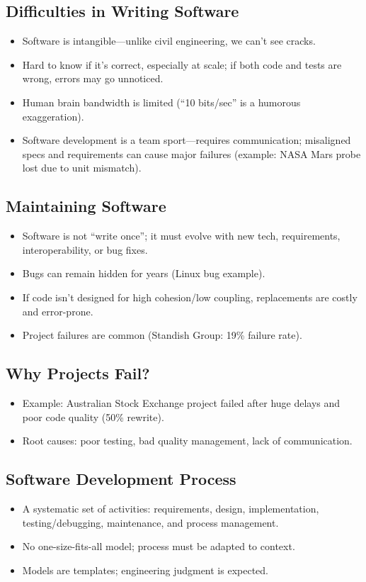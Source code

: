 \documentclass[11pt,a4paper]{article}
\begin{document}
\subsection*{Difficulties in Writing Software}
\begin{itemize}
    \item Software is intangible---unlike civil engineering, we can’t see cracks.
    \item Hard to know if it’s correct, especially at scale; if both code and tests are wrong, errors may go unnoticed.
    \item Human brain bandwidth is limited (``10 bits/sec'' is a humorous exaggeration).
    \item Software development is a team sport---requires communication; misaligned specs and requirements can cause major failures (example: NASA Mars probe lost due to unit mismatch).
\end{itemize}

\subsection*{Maintaining Software}
\begin{itemize}
    \item Software is not ``write once''; it must evolve with new tech, requirements, interoperability, or bug fixes.
    \item Bugs can remain hidden for years (Linux bug example).
    \item If code isn’t designed for high cohesion/low coupling, replacements are costly and error-prone.
    \item Project failures are common (Standish Group: 19\% failure rate).
\end{itemize}

\subsection*{Why Projects Fail?}
\begin{itemize}
    \item Example: Australian Stock Exchange project failed after huge delays and poor code quality (50\% rewrite).
    \item Root causes: poor testing, bad quality management, lack of communication.
\end{itemize}

\subsection*{Software Development Process}
\begin{itemize}
    \item A systematic set of activities: requirements, design, implementation, testing/debugging, maintenance, and process management.
    \item No one-size-fits-all model; process must be adapted to context.
    \item Models are templates; engineering judgment is expected.
\end{itemize}
\end{document}
